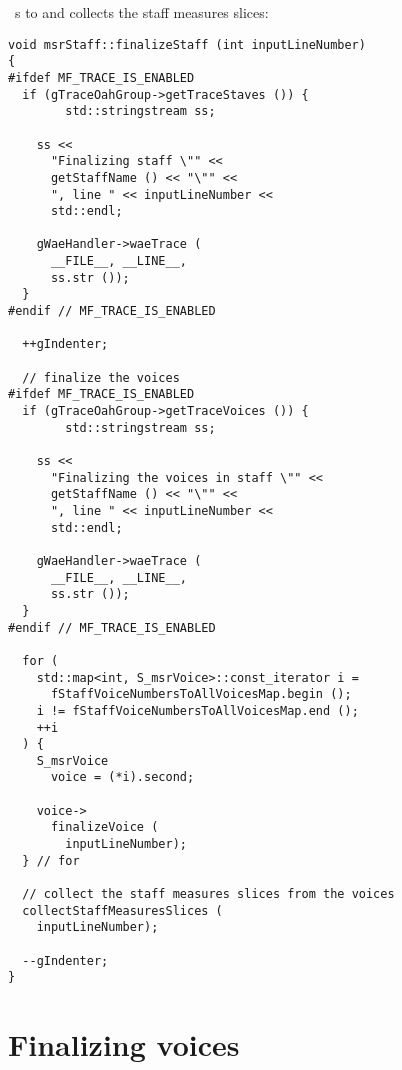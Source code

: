  \cascade\ s to  and collects the staff measures slices:
\begin{lstlisting}[language=CPlusPlus]
void msrStaff::finalizeStaff (int inputLineNumber)
{
#ifdef MF_TRACE_IS_ENABLED
  if (gTraceOahGroup->getTraceStaves ()) {
		std::stringstream ss;

    ss <<
      "Finalizing staff \"" <<
      getStaffName () << "\"" <<
      ", line " << inputLineNumber <<
      std::endl;

    gWaeHandler->waeTrace (
      __FILE__, __LINE__,
      ss.str ());
  }
#endif // MF_TRACE_IS_ENABLED

  ++gIndenter;

  // finalize the voices
#ifdef MF_TRACE_IS_ENABLED
  if (gTraceOahGroup->getTraceVoices ()) {
		std::stringstream ss;

    ss <<
      "Finalizing the voices in staff \"" <<
      getStaffName () << "\"" <<
      ", line " << inputLineNumber <<
      std::endl;

    gWaeHandler->waeTrace (
      __FILE__, __LINE__,
      ss.str ());
  }
#endif // MF_TRACE_IS_ENABLED

  for (
    std::map<int, S_msrVoice>::const_iterator i =
      fStaffVoiceNumbersToAllVoicesMap.begin ();
    i != fStaffVoiceNumbersToAllVoicesMap.end ();
    ++i
  ) {
    S_msrVoice
      voice = (*i).second;

    voice->
      finalizeVoice (
        inputLineNumber);
  } // for

  // collect the staff measures slices from the voices
  collectStaffMeasuresSlices (
    inputLineNumber);

  --gIndenter;
}
\end{lstlisting}


\section{Finalizing voices}

